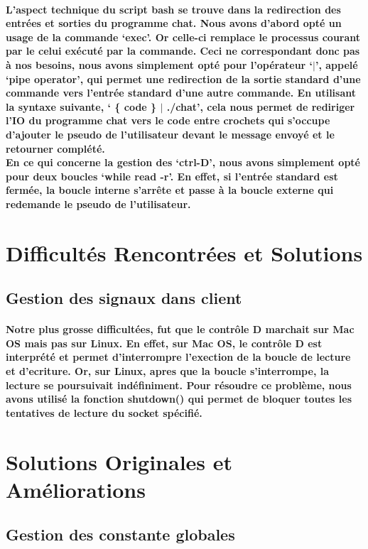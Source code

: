 \documentclass[utf8]{article}
\begin{document}
\paragraph{L'aspect technique du script bash se trouve dans la redirection des entrées et sorties du programme chat. Nous avons d'abord opté un usage de la commande `exec'. Or celle-ci remplace le processus courant
par le celui exécuté par la commande. Ceci ne correspondant donc pas à nos besoins, nous avons simplement opté pour l'opérateur `$|$', appelé `pipe operator', qui permet une redirection de la sortie standard d'une 
commande vers l'entrée standard d'une autre commande. En utilisant la syntaxe suivante, ` \{ code \} $|$ ./chat', cela nous permet de rediriger l'IO du programme chat vers le code entre crochets qui s'occupe
d'ajouter le pseudo de l'utilisateur devant le message envoyé et le retourner complété. \\
En ce qui concerne la gestion des `ctrl-D', nous avons simplement opté pour deux boucles `while read -r'. En effet, si l'entrée standard est fermée, la boucle interne s'arrête et passe à la boucle externe qui
redemande le pseudo de l'utilisateur.} %

\section{Difficultés Rencontrées et Solutions}
\subsection{Gestion des signaux dans client}
\paragraph{Notre plus grosse difficultées, fut que le contrôle D marchait sur Mac OS mais pas sur Linux. En effet, sur Mac OS, 
le contrôle D est interprété et permet d'interrompre l'exection de la boucle de lecture et d'ecriture. Or, sur Linux, apres que 
la boucle s'interrompe, la lecture se poursuivait indéfiniment. Pour résoudre ce problème, nous avons utilisé la fonction 
shutdown() qui permet de bloquer toutes les tentatives de lecture du socket spécifié.}

\section{Solutions Originales et Améliorations}
\subsection{Gestion des constante globales}
\end{document}
